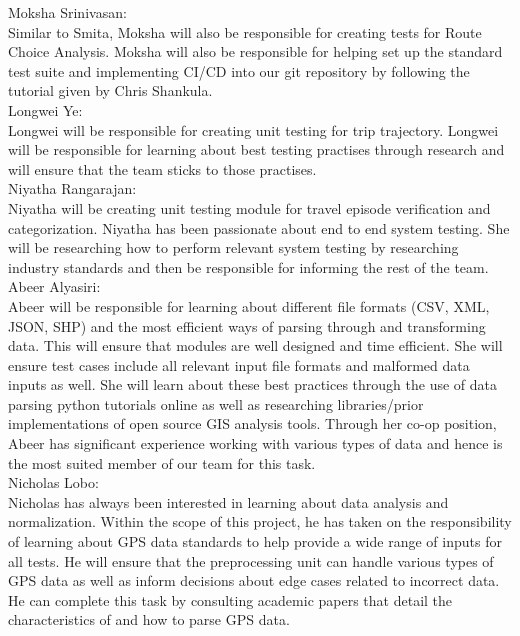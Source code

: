 \documentclass[12pt, titlepage]{article}
\begin{document}
\noindent Moksha Srinivasan:\\ Similar to Smita, Moksha will also be responsible for creating tests for Route Choice Analysis. Moksha will also be responsible for helping set up the standard test suite and implementing CI/CD into our git repository by following the tutorial given by Chris Shankula. \\

\noindent Longwei Ye:\\
Longwei will be responsible for creating unit testing for trip trajectory. Longwei will be responsible for learning about best testing practises through research and will ensure that the team sticks to those practises.\\

\noindent Niyatha Rangarajan:\\
Niyatha will be creating unit testing module for travel episode verification and categorization. Niyatha has been passionate about end to end system testing. She will be researching how to perform relevant system testing by researching industry standards and then be responsible for informing the rest of the team.\\

\noindent Abeer Alyasiri:\\ Abeer will be responsible for learning about different file formats (CSV, XML, JSON, SHP) and the most efficient ways of parsing through and transforming data. This will ensure that modules are well designed and time efficient. She will ensure test cases include all relevant input file formats and malformed data inputs as well. She will learn about these best practices through the use of data parsing python tutorials online as well as researching libraries/prior implementations of open source GIS analysis tools. Through her co-op position, Abeer has significant experience working with various types of data and hence is the most suited member of our team for this task.   \\

\noindent Nicholas Lobo: \\
Nicholas has always been interested in learning about data analysis and normalization. Within the scope of this project, he has taken on the responsibility of learning about GPS data standards to help provide a wide range of inputs for all tests. He will ensure that the preprocessing unit can handle various types of GPS data as well as inform decisions about edge cases related to incorrect data. He can complete this task by consulting academic papers that detail the characteristics of and how to parse GPS data.\\
\end{document}
